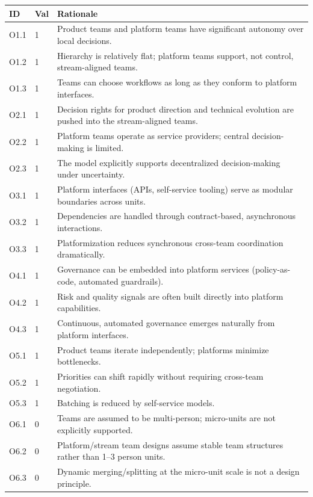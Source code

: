 \documentclass[11pt, a4paper, twocolumn]{article} %
\begin{document}
\begin{table}[h]
\centering
\begingroup\small
\setlength{\tabcolsep}{4pt}%
\begin{tabularx}{\linewidth}{llX}
\toprule
\textbf{ID} & \textbf{Val} & \textbf{Rationale} \\
\midrule
O1.1 & 1 &
Product teams and platform teams have significant autonomy over local decisions. \\
O1.2 & 1 &
Hierarchy is relatively flat; platform teams support, not control, stream-aligned teams. \\
O1.3 & 1 &
Teams can choose workflows as long as they conform to platform interfaces. \\
\midrule
O2.1 & 1 &
Decision rights for product direction and technical evolution are pushed into the stream-aligned teams. \\
O2.2 & 1 &
Platform teams operate as service providers; central decision-making is limited. \\
O2.3 & 1 &
The model explicitly supports decentralized decision-making under uncertainty. \\
\midrule
O3.1 & 1 &
Platform interfaces (APIs, self-service tooling) serve as modular boundaries across units. \\
O3.2 & 1 &
Dependencies are handled through contract-based, asynchronous interactions. \\
O3.3 & 1 &
Platformization reduces synchronous cross-team coordination dramatically. \\
\midrule
O4.1 & 1 &
Governance can be embedded into platform services (policy-as-code, automated guardrails). \\
O4.2 & 1 &
Risk and quality signals are often built directly into platform capabilities. \\
O4.3 & 1 &
Continuous, automated governance emerges naturally from platform interfaces. \\
\midrule
O5.1 & 1 &
Product teams iterate independently; platforms minimize bottlenecks. \\
O5.2 & 1 &
Priorities can shift rapidly without requiring cross-team negotiation. \\
O5.3 & 1 &
Batching is reduced by self-service models. \\
\midrule
O6.1 & 0 &
Teams are assumed to be multi-person; micro-units are not explicitly supported. \\
O6.2 & 0 &
Platform/stream team designs assume stable team structures rather than 1--3 person units. \\
O6.3 & 0 &
Dynamic merging/splitting at the micro-unit scale is not a design principle. \\
\bottomrule
\end{tabularx}
\endgroup
\end{table}
\end{document}
